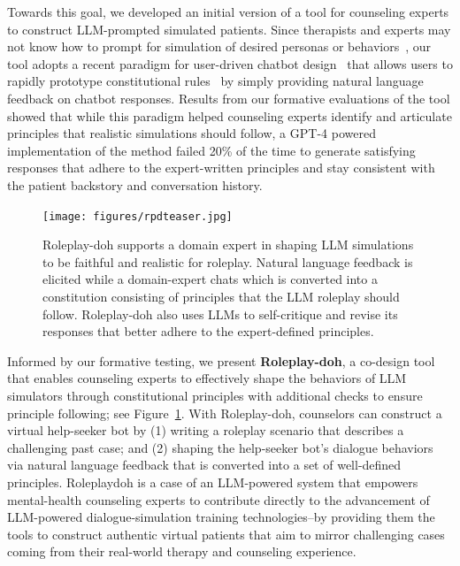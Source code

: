Towards this goal, we developed an initial version of a tool for counseling experts to construct LLM-prompted simulated patients. Since therapists and experts may not know how to prompt for simulation of desired personas or behaviors~\cite{whyjohnnycantprompt}, our tool adopts a recent paradigm for user-driven chatbot design~\cite{petridis2023constitutionmaker} that allows users to rapidly prototype constitutional rules~\cite{bai2022constitutional} by simply providing natural language feedback on chatbot responses. Results from our formative evaluations of the tool showed that while this paradigm helped counseling experts identify and articulate principles that realistic simulations should follow, a GPT-4 powered implementation of the method failed 20\% of the time to generate satisfying responses that adhere to the expert-written principles and stay consistent with the patient backstory and conversation history. 


\begin{figure}[t]
    \centering
    \texttt{[image: figures/rpdteaser.jpg]}
    \caption{Roleplay-doh supports a domain expert in shaping LLM simulations to be faithful and realistic for roleplay. Natural language feedback is elicited while a domain-expert chats which is converted into a constitution consisting of principles that the LLM roleplay should follow. Roleplay-doh also uses LLMs to self-critique and revise its responses that better adhere to the expert-defined principles.}
    \label{fig:rpdteaser}
\end{figure}


Informed by our formative testing, we present \textbf{Roleplay-doh}, a co-design tool that enables counseling experts to effectively shape the behaviors of LLM simulators through constitutional principles with additional checks to ensure principle following; see Figure~\ref{fig:rpdteaser}. With Roleplay-doh, counselors can construct a virtual help-seeker bot by (1) writing a roleplay scenario that describes a challenging past case; and (2) shaping the help-seeker bot's dialogue behaviors via natural language feedback that is converted into a set of well-defined principles. Roleplaydoh is a case of an LLM-powered system that empowers mental-health counseling experts to contribute directly to the advancement of LLM-powered dialogue-simulation training technologies--by providing them the tools to construct authentic virtual patients that aim to mirror challenging cases coming from their real-world therapy and counseling experience.   

